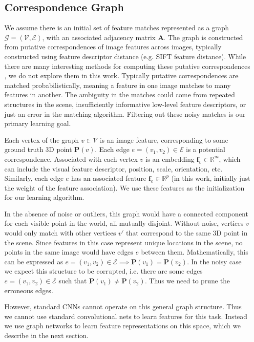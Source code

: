 \documentclass[10pt,twocolumn,letterpaper]{article}
\newcommand{\bR}{\mathbb{R}}
\newcommand{\mat}[1]{\mathbf{#1}}
\begin{document}
\subsection{Correspondence Graph}
We assume there is an initial set of feature matches represented as a graph $\mathcal{G} = (\mathcal{V}, \mathcal{E})$, with an associated adjacency matrix $\mat{A}$.
The graph is constructed from putative correspondences of image features across images, typically constructed using feature descriptor distance (e.g. SIFT feature distance).
While there are many interesting methods for computing these putative correspondences \cite{suh2015subgraph, yi2018learning}, we do not explore them in this work.
Typically putative correspondences are matched probabilistically, meaning a feature in one image matches to many features in another.
The ambiguity in the matches could come from repeated structures in the scene, insufficiently informative low-level feature descriptors, or just an error in the matching algorithm.
Filtering out these noisy matches is our primary learning goal.

Each vertex of the graph $v \in \mathcal{V}$ is an image feature, corresponding to some ground truth 3D point $\mat{P}(v)$.
Each edge $e = (v_1, v_2) \in \mathcal{E}$ is a potential correspondence.
Associated with each vertex $v$ is an embedding $\mat{f}_v \in \bR^m$, which can include the visual feature descriptor, position, scale, orientation, etc.
Similarly, each edge $e$ has an associated feature $\mat{f}_e \in \bR^p$ (in this work, initially just the weight of the feature association).
We use these features as the initialization for our learning algorithm.

In the absence of noise or outliers, this graph would have a connected component for each visible point in the world, all mutually disjoint.
Without noise, vertices $v$ would only match with other vertices $v'$ that correspond to the same 3D point in the scene.
Since features in this case represent unique locations in the scene, no points in the same image would have edges $e$ between them.
Mathematically, this can be expressed as $e = (v_1, v_2) \in \mathcal{E} \implies \mat{P}(v_1) = \mat{P}(v_2)$.
In the noisy case we expect this structure to be corrupted, i.e. there are some edges $e = (v_1, v_2) \in \mathcal{E}$ such that $\mat{P}(v_1) \neq \mat{P}(v_2)$.
Thus we need to prune the erroneous edges.

However, standard CNNs cannot operate on this general graph structure.
Thus we cannot use standard convolutional nets to learn features for this task.
Instead we use graph networks to learn feature representations on this space, which we describe in the next section.
\end{document}
